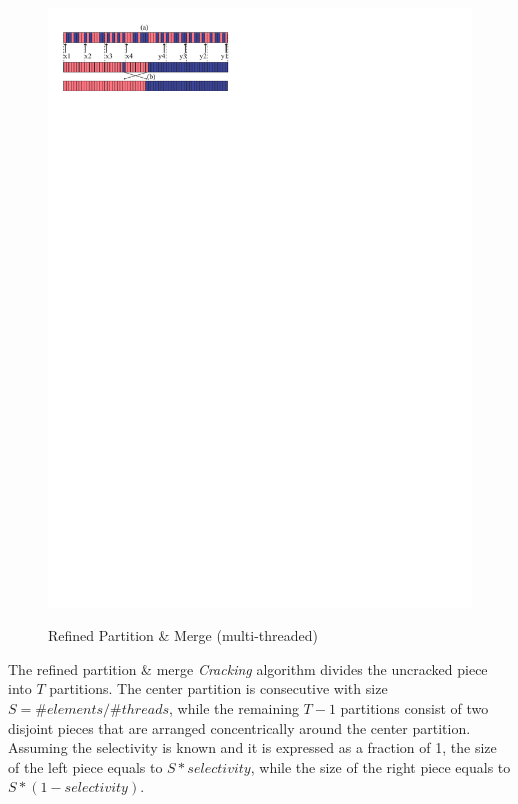\begin{figure}[!t]
\begin{center}
\includegraphics[trim=0.6cm 25.7cm 0cm 1cm]{Figures/damon/mcrack2}
\caption{Refined Partition \& Merge (multi-threaded)}
\vspace{-2.5ex}
\label{fig:mcrack2}
\end{center}
\end{figure}
The refined partition \& merge \emph{Cracking} algorithm divides the uncracked
piece into $T$ partitions.  
The center partition is consecutive with
size $S=\#elements/\#threads$, while the remaining $T-1$ partitions consist of two disjoint
pieces that are arranged concentrically around the center partition.
Assuming the selectivity is known and it is expressed as a fraction of 1, the size of the left piece equals to $S*selectivity$, while the size of the right piece equals to $S*(1-selectivity)$.
